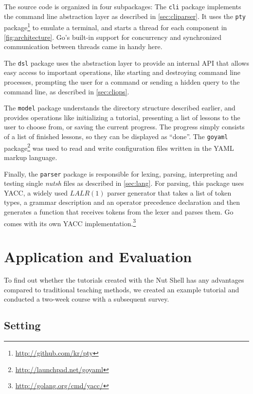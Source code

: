 \documentclass[paper=a4,abstract=on,cleardoublepage=empty,numbers=noenddot,toc=bib,12pt,appendixprefix=true]{scrreprt}
\begin{document}
The source code is organized in four subpackages: The \texttt{cli} package implements the command line abstraction layer as described in \cref{sec:cliparser}. It uses the \texttt{pty} package\footnote{\url{http://github.com/kr/pty}} to emulate a terminal, and starts a thread for each component in \cref{fig:architecture}. Go's built-in support for concurrency and synchronized communication between threads came in handy here.

The \texttt{dsl} package uses the abstraction layer to provide an internal API that allows easy access to important operations, like starting and destroying command line processes, prompting the user for a command or sending a hidden query to the command line, as described in \cref{sec:cliops}.

The \texttt{model} package understands the directory structure described earlier, and provides operations like initializing a tutorial, presenting a list of lessons to the user to choose from, or saving the current progress. The progress simply consists of a list of finished lessons, so they can be displayed as “done”. The \texttt{goyaml} package\footnote{\url{http://launchpad.net/goyaml}} was used to read and write configuration files written in the \textsc{YAML} markup language.

Finally, the \texttt{parser} package is responsible for lexing, parsing, interpreting and testing single \emph{nutsh} files as described in \cref{sec:lang}. For parsing, this package uses \textsc{YACC}, a widely used $LALR(1)$ parser generator that takes a list of token types, a grammar description and an operator precedence declaration and then generates a function that receives tokens from the lexer and parses them. Go comes with its own YACC implementation.\footnote{\url{http://golang.org/cmd/yacc/}}

\chapter{Application and Evaluation}
\label{sec:evaluation}

To find out whether the tutorials created with the Nut Shell has any advantages compared to traditional teaching methods, we created an example tutorial and conducted a two-week course with a subsequent survey.

\section{Setting}
\end{document}
